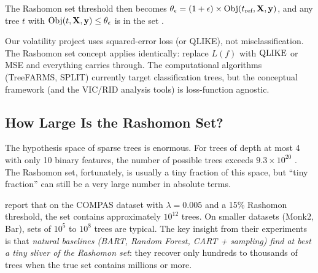 The Rashomon set threshold then becomes $\theta_\epsilon = (1 + \epsilon)
\times \operatorname{Obj}(t_{\text{ref}}, \mathbf{X}, \mathbf{y})$, and any tree $t$ with
$\operatorname{Obj}(t, \mathbf{X}, \mathbf{y}) \leq \theta_\epsilon$ is in the set
\citep{XinEtAl2022}.

\begin{projectconnection}
Our volatility project uses squared-error loss (or QLIKE), not
misclassification.  The Rashomon set concept applies identically: replace
$L(f)$ with $\operatorname{QLIKE}$ or MSE and everything carries through.  The
computational algorithms (TreeFARMS, SPLIT) currently target classification
trees, but the conceptual framework (and the VIC/RID analysis tools) is
loss-function agnostic.
\end{projectconnection}

\subsection{How Large Is the Rashomon Set?}

The hypothesis space of sparse trees is enormous.  For trees of depth at most
4 with only 10 binary features, the number of possible trees exceeds
$9.3 \times 10^{20}$ \citep{XinEtAl2022}.  The Rashomon set, fortunately, is
usually a tiny fraction of this space, but ``tiny fraction'' can still be
a very large number in absolute terms.

\citet{XinEtAl2022} report that on the COMPAS dataset with
$\lambda = 0.005$ and a 15\% Rashomon threshold, the set contains
approximately $10^{12}$ trees.  On smaller datasets (Monk2, Bar), sets of
$10^5$ to $10^8$ trees are typical.  The key insight from their experiments
is that \emph{natural baselines (BART, Random Forest, CART + sampling) find
at best a tiny sliver of the Rashomon set}: they recover only hundreds to
thousands of trees when the true set contains millions or more.

